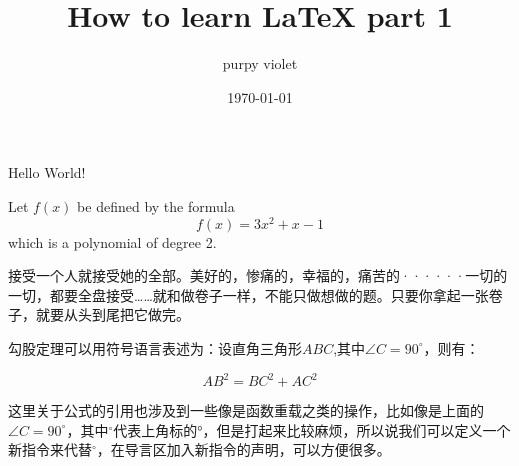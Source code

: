 \documentclass{article} %
\title{\heiti How to learn LaTeX part 1}%
\author{purpy violet}
\date{\today}
\begin{document}
		\maketitle

		Hello World!

		Let $f(x)$ be defined by the formula 
		$$f(x) = 3x^2 + x - 1$$ which is a polynomial of %
		degree 2. 


接受一个人就接受她的全部。美好的，惨痛的，幸福的，痛苦的······一切的一切，都要全盘接受……就和做卷子一样，不能只做想做的题。只要你拿起一张卷子，就要从头到尾把它做完。


勾股定理可以用符号语言表述为：设直角三角形$ABC$,其中$\angle C =90^\circ$，则有：%




\begin{equation} %
AB^2 = BC^2 + AC^2 
\end{equation}

这里关于公式的引用也涉及到一些像是函数重载之类的操作，比如像是上面的$\angle C =90^\circ$，其中$^\circ$代表上角标的°，但是打起来比较麻烦，所以说我们可以定义一个新指令来代替$^\circ$，在导言区加入新指令的声明，可以方便很多。
\end{document}
